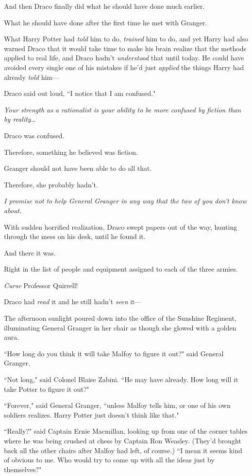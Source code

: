 And then Draco finally did what he should have done much earlier.

What he should have done after the first time he met with Granger.

What Harry Potter had \emph{told} him to do, \emph{trained} him to do, and yet Harry had also warned Draco that it would take time to make his brain realize that the methods applied to real life, and Draco hadn't \emph{understood} that until today. He could have avoided every single one of his mistakes if he'd just \emph{applied} the things Harry had already \emph{told} him—

Draco said out loud, ``I notice that I am confused."

\emph{Your strength as a rationalist is your ability to be more confused by fiction than by reality…}

Draco was confused.

Therefore, something he believed was fiction.

Granger should not have been able to do all that.

Therefore, she probably hadn't.

\emph{I promise not to help General Granger in any way that the two of you don't know about.}

With sudden horrified realization, Draco swept papers out of the way, hunting through the mess on his desk, until he found it.

And there it was.

Right in the list of people and equipment assigned to each of the three armies.

\emph{Curse} Professor Quirrell!

Draco had \emph{read} it and he still hadn't \emph{seen} it—

\later

The afternoon sunlight poured down into the office of the Sunshine Regiment, illuminating General Granger in her chair as though she glowed with a golden aura.

``How long do you think it will take Malfoy to figure it out?" said General Granger.

``Not long," said Colonel Blaise Zabini. ``He may have already. How long will it take Potter to figure it out?"

``Forever," said General Granger, ``unless Malfoy tells him, or one of his own soldiers realizes. Harry Potter just doesn't think like that."

``Really?" said Captain Ernie Macmillan, looking up from one of the corner tables where he was being crushed at chess by Captain Ron Weasley. (They'd brought back all the other chairs after Malfoy had left, of course.) ``I mean it seems kind of obvious to me. Who would try to come up with all the ideas just by themselves?"

